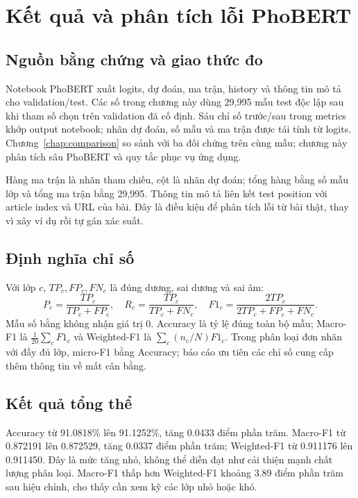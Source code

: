 \chapter{Kết quả và phân tích lỗi PhoBERT}
\label{chap:results}
\section{Nguồn bằng chứng và giao thức đo}
Notebook PhoBERT xuất logits, dự đoán, ma trận, history và thông tin mô tả cho validation/test. Các số trong chương này dùng 29,995 mẫu test độc lập sau khi tham số chọn trên validation đã cố định. Sáu chỉ số trước/sau trong metrics khớp output notebook; nhãn dự đoán, số mẫu và ma trận được tái tính từ logits. Chương~\ref{chap:comparison} so sánh với ba đối chứng trên cùng mẫu; chương này phân tích sâu PhoBERT và quy tắc phục vụ ứng dụng.

Hàng ma trận là nhãn tham chiếu, cột là nhãn dự đoán; tổng hàng bằng số mẫu lớp và tổng ma trận bằng 29,995. Thông tin mô tả liên kết test position với article index và URL của bài. Đây là điều kiện để phân tích lỗi từ bài thật, thay vì xây ví dụ rồi tự gán xác suất.

\section{Định nghĩa chỉ số}
Với lớp $c$, $TP_c,FP_c,FN_c$ là đúng dương, sai dương và sai âm:
\begin{equation}P_c=\frac{TP_c}{TP_c+FP_c},\quad R_c=\frac{TP_c}{TP_c+FN_c},\quad F1_c=\frac{2TP_c}{2TP_c+FP_c+FN_c}.\end{equation}
Mẫu số bằng không nhận giá trị 0. Accuracy là tỷ lệ đúng toàn bộ mẫu; Macro-F1 là $\frac1{20}\sum_cF1_c$ và Weighted-F1 là $\sum_c(n_c/N)F1_c$. Trong phân loại đơn nhãn với đầy đủ lớp, micro-F1 bằng Accuracy; báo cáo ưu tiên các chỉ số cung cấp thêm thông tin về mất cân bằng.

\section{Kết quả tổng thể}
Accuracy từ 91.0818\% lên 91.1252\%, tăng 0.0433 điểm phần trăm. Macro-F1 từ 0.872191 lên 0.872529, tăng 0.0337 điểm phần trăm; Weighted-F1 từ 0.911176 lên 0.911450. Đây là mức tăng nhỏ, không thể diễn đạt như cải thiện mạnh chất lượng phân loại. Macro-F1 thấp hơn Weighted-F1 khoảng 3.89 điểm phần trăm sau hiệu chỉnh, cho thấy cần xem kỹ các lớp nhỏ hoặc khó.

